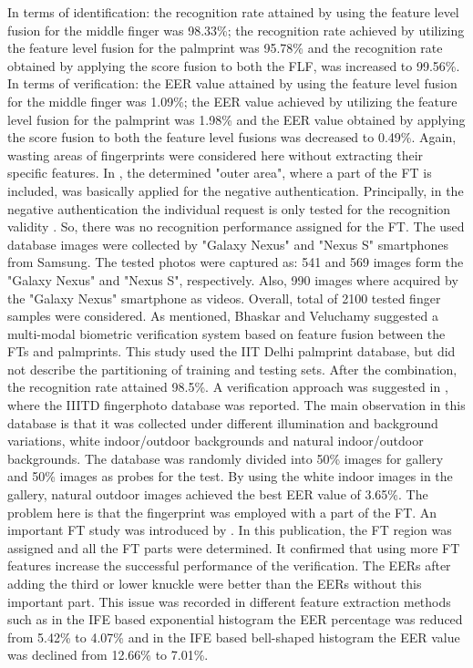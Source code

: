 \documentclass[review]{elsarticle}
\begin{document}
	In terms of identification: the recognition rate attained by using the feature level fusion for the middle finger was 98.33\%; the recognition rate achieved by utilizing the feature level fusion for the palmprint was 95.78\% and the recognition rate obtained by applying the score fusion to both the FLF, was increased to 99.56\%. In terms of verification: the EER value attained by using the feature level fusion for the middle finger was 1.09\%; the EER value achieved by utilizing the feature level fusion for the palmprint was 1.98\% and the EER value obtained by applying the score fusion to both the feature level fusions was decreased to 0.49\%. Again, wasting areas of fingerprints were considered here without extracting their specific features. In \cite{stein2013video}, the determined "outer area", where a part of the FT is included, was basically applied for the negative authentication. Principally, in the negative authentication the individual request is only tested for the recognition validity \cite{dasgupta2017negative}. So, there was no recognition performance assigned for the FT. The used database images were collected by "Galaxy Nexus" and "Nexus S" smartphones from Samsung. The tested photos were captured as: 541 and 569
	images form the "Galaxy Nexus" and "Nexus S", respectively. Also, 990 images where acquired by the "Galaxy Nexus" smartphone as videos. Overall, total of 2100 tested finger samples were considered. 
	As mentioned, Bhaskar and Veluchamy \cite{Bhaskar2014Hand} suggested a multi-modal biometric verification system based on feature fusion between the FTs and palmprints. This study used the IIT Delhi palmprint database, but did not describe the partitioning of training and testing sets. After the combination, the recognition rate attained 98.5\%.
	A verification approach was suggested in \cite{sankaran2015Onsmartphone}, where the IIITD fingerphoto database was reported. The main observation in this database is that it was collected under different illumination and background variations, white indoor/outdoor backgrounds and natural indoor/outdoor backgrounds. The database was randomly divided into 50\% images for gallery and 50\% images as probes for the test. By using the white indoor images in the gallery, natural outdoor images achieved the best EER value of 3.65\%. The problem here is that the fingerprint was employed with a part of the FT. An important FT study was introduced by \cite{Al-Nima2015Human}. In this publication, the FT region was assigned and all the FT parts were determined. It confirmed that using more FT features increase the successful performance of the verification. The EERs after adding the third or lower knuckle were better than the EERs without this important part. This issue was recorded in different feature extraction methods such as in the IFE based exponential histogram the EER percentage was reduced from 5.42\% to 4.07\% and in the IFE based bell-shaped histogram the EER value was declined from 12.66\% to 7.01\%. 
\end{document}
